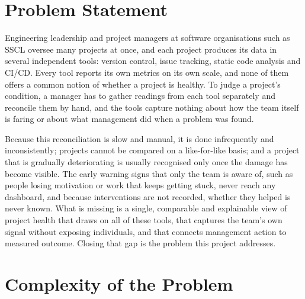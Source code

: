 \section{Problem Statement}
\label{sec:problem-statement}

Engineering leadership and project managers at software organisations such as
SSCL oversee many projects at once, and each project produces its data in
several independent tools: version control, issue tracking, static code
analysis and CI/CD. Every tool reports its own metrics on its own scale, and
none of them offers a common notion of whether a project is healthy. To judge a
project's condition, a manager has to gather readings from each tool separately
and reconcile them by hand, and the tools capture nothing about how the team
itself is faring or about what management did when a problem was found.

Because this reconciliation is slow and manual, it is done infrequently and
inconsistently; projects cannot be compared on a like-for-like basis; and a
project that is gradually deteriorating is usually recognised only once the
damage has become visible. The early warning signs that only the team is aware of, such
as people losing motivation or work that keeps getting stuck, never reach any
dashboard, and because
interventions are not recorded, whether they helped is never known. What is
missing is a single, comparable and explainable view of project health that
draws on all of these tools, that captures the team's own signal without
exposing individuals, and that connects management action to measured outcome.
Closing that gap is the problem this project addresses.

\section{Complexity of the Problem}
\label{sec:complexity}

